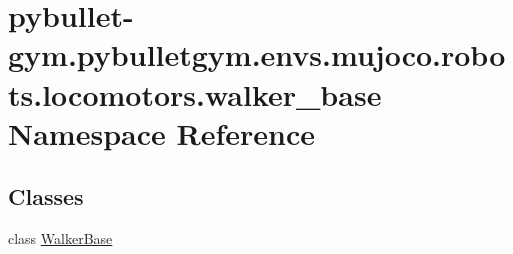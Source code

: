 \hypertarget{namespacepybullet-gym_1_1pybulletgym_1_1envs_1_1mujoco_1_1robots_1_1locomotors_1_1walker__base}{}\section{pybullet-\/gym.pybulletgym.\+envs.\+mujoco.\+robots.\+locomotors.\+walker\+\_\+base Namespace Reference}
\label{namespacepybullet-gym_1_1pybulletgym_1_1envs_1_1mujoco_1_1robots_1_1locomotors_1_1walker__base}
\subsection*{Classes}
\begin{DoxyCompactItemize}
\item 
class \hyperlink{classpybullet-gym_1_1pybulletgym_1_1envs_1_1mujoco_1_1robots_1_1locomotors_1_1walker__base_1_1_walker_base}{Walker\+Base}
\end{DoxyCompactItemize}
